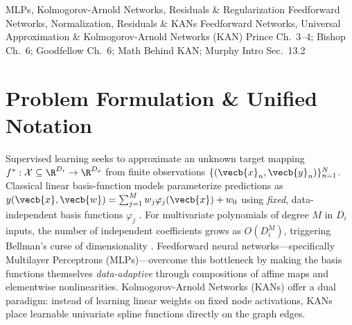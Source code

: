 \documentclass[../../../../master.tex]{subfiles}
\begin{document}
  {MLPs, Kolmogorov-Arnold Networks, Residuals \& Regularization}
  {Feedforward Networks, Normalization, Residuals \& KANs}
  {Feedforward Networks, Universal Approximation \& Kolmogorov-Arnold Networks (KAN)}
  {Prince Ch.~3--4; Bishop Ch.~6; Goodfellow Ch.~6; Math Behind KAN; Murphy Intro Sec.~13.2}

\section{Problem Formulation \& Unified Notation}
\label{sec:mlpkan:formulation}

Supervised learning seeks to approximate an unknown target mapping $f^* : \mathcal{X} \subseteq \R^{D_i} \to \R^{D_o}$ from finite observations $\{(\vecb{x}_n, \vecb{y}_n)\}_{n=1}^N$. Classical linear basis-function models parameterize predictions as $y(\vecb{x}, \vecb{w}) = \sum_{j=1}^M w_j \varphi_j(\vecb{x}) + w_0$ using \emph{fixed}, data-independent basis functions $\varphi_j$ . For multivariate polynomials of degree $M$ in $D_i$ inputs, the number of independent coefficients grows as $O(D_i^M)$, triggering Bellman's curse of dimensionality . Feedforward neural networks---specifically Multilayer Perceptrons (MLPs)---overcome this bottleneck by making the basis functions themselves \emph{data-adaptive} through compositions of affine maps and elementwise nonlinearities. Kolmogorov-Arnold Networks (KANs) offer a dual paradigm: instead of learning linear weights on fixed node activations, KANs place learnable univariate spline functions directly on the graph edges.
\end{document}
